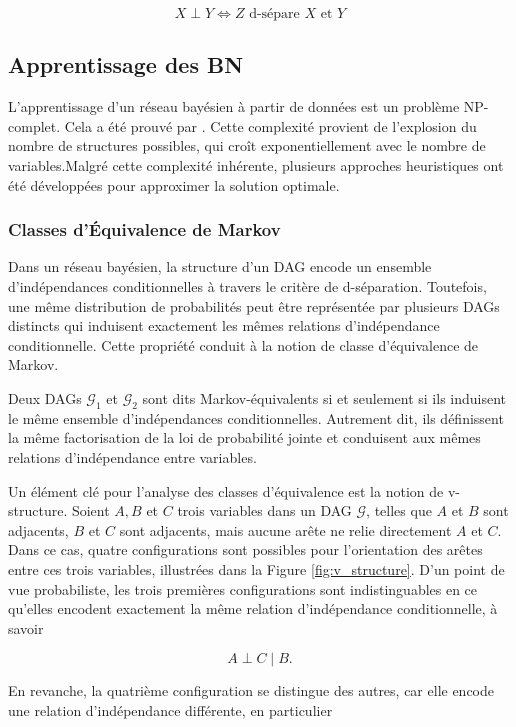 \documentclass{article}
\begin{document}
$$
    X \perp Y \iff Z \text{ d-sépare } X \text{ et } Y
$$

\subsection{Apprentissage des BN}

L'apprentissage d'un réseau bayésien à partir de données est un problème NP-complet. Cela a été prouvé par \citet{chickering1996learning}. Cette complexité provient de l'explosion du nombre de structures possibles,
qui croît exponentiellement avec le nombre de variables.Malgré cette complexité inhérente, plusieurs approches heuristiques ont
été développées pour approximer la solution optimale.

\subsubsection{Classes d'Équivalence de Markov}

Dans un réseau bayésien, la structure d'un DAG encode un ensemble d'indépendances conditionnelles à travers le critère de
d-séparation. Toutefois, une même distribution de probabilités peut être représentée par plusieurs DAGs distincts qui
induisent exactement les mêmes relations d'indépendance conditionnelle. Cette propriété conduit à la notion de classe
d'équivalence de Markov.

Deux DAGs $\mathcal{G}_1$ et $\mathcal{G}_2$ sont dits Markov-équivalents si et seulement si ils induisent le même ensemble
d'indépendances conditionnelles. Autrement dit, ils définissent la même factorisation de la loi de probabilité jointe et
conduisent aux mêmes relations d'indépendance entre variables.

Un élément clé pour l'analyse des classes d'équivalence est la notion de v-structure. Soient $A, B$ et $C$ trois variables
dans un DAG $\mathcal{G}$, telles que $A$ et $B$ sont adjacents, $B$ et $C$ sont adjacents, mais aucune arête ne relie
directement $A$ et $C$. Dans ce cas, quatre configurations sont possibles pour l'orientation des arêtes entre ces trois
variables, illustrées dans la Figure \ref{fig:v_structure}. D'un point de vue probabiliste, les trois premières configurations sont indistinguables
en ce qu'elles encodent exactement la même relation d'indépendance conditionnelle, à savoir

$$
    A \perp C \mid B.
$$

En revanche, la quatrième configuration se distingue des autres, car elle encode une relation d'indépendance différente,
en particulier
\end{document}
